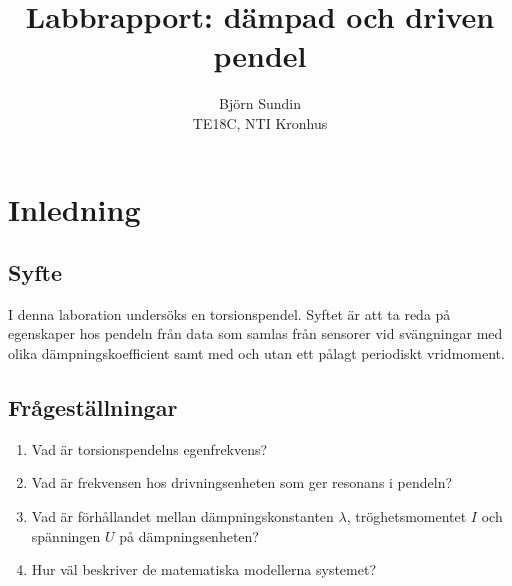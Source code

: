 \documentclass[12pt, a4paper]{article}
\title{Labbrapport: dämpad och driven pendel}
\author{Björn Sundin\medskip\\ TE18C, NTI Kronhus}
\begin{document}
\maketitle

\clearpage
\section{Inledning}
\subsection{Syfte}
I denna laboration undersöks en torsionspendel. Syftet är att ta reda på egenskaper hos pendeln från data som samlas från sensorer vid svängningar med olika dämpnings\-koefficient samt med och utan ett pålagt periodiskt vridmoment.
\subsection{Frågeställningar}
\begin{enumerate}
	\item Vad är torsionspendelns egenfrekvens?
	\item Vad är frekvensen hos drivningsenheten som ger resonans i pendeln?
	\item Vad är förhållandet mellan dämpningskonstanten $\lambda$, tröghetsmomentet $I$ och spänn\-ingen $U$ på dämpningsenheten?
	\item Hur väl beskriver de matematiska modellerna systemet?
\end{enumerate}
\end{document}
